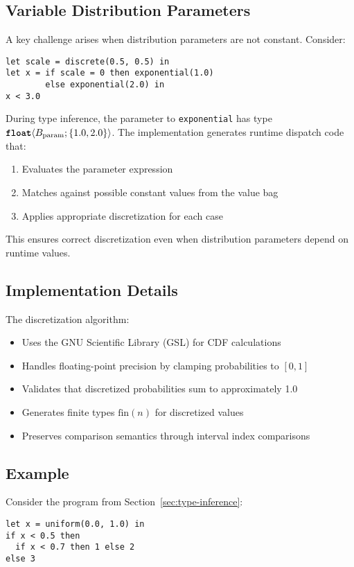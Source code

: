 \subsection{Variable Distribution Parameters}

A key challenge arises when distribution parameters are not constant. Consider:
\begin{lstlisting}
let scale = discrete(0.5, 0.5) in
let x = if scale = 0 then exponential(1.0) 
        else exponential(2.0) in
x < 3.0
\end{lstlisting}

During type inference, the parameter to \texttt{exponential} has type $\text{\ttfamily\bfseries float}\langle B_{\text{param}}; \{1.0, 2.0\} \rangle$. The implementation generates runtime dispatch code that:
\begin{enumerate}
    \item Evaluates the parameter expression
    \item Matches against possible constant values from the value bag
    \item Applies appropriate discretization for each case
\end{enumerate}

This ensures correct discretization even when distribution parameters depend on runtime values.

\subsection{Implementation Details}

The discretization algorithm:
\begin{itemize}
    \item Uses the GNU Scientific Library (GSL) for CDF calculations
    \item Handles floating-point precision by clamping probabilities to $[0,1]$
    \item Validates that discretized probabilities sum to approximately 1.0
    \item Generates finite types $\text{fin}(n)$ for discretized values
    \item Preserves comparison semantics through interval index comparisons
\end{itemize}

\subsection{Example}

Consider the program from Section~\ref{sec:type-inference}:
\begin{lstlisting}
let x = uniform(0.0, 1.0) in
if x < 0.5 then 
  if x < 0.7 then 1 else 2
else 3
\end{lstlisting}


